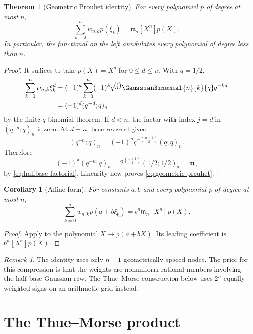 \documentclass[11pt,a4paper,oneside,openany]{book}
\newtheorem{theorem}{Theorem}[chapter]
\newtheorem{corollary}[corollary]{Corollary}
\theoremstyle{definition}
\theoremstyle{remark}
\newtheorem{remark}[remark]{Remark}
\begin{document}
\begin{theorem}[Geometric Prouhet identity]\label{thm:geometric-prouhet}
For every polynomial $p$ of degree at most $n$,
\begin{equation}\label{eq:geometric-prouhet}
 \sum_{k=0}^{n}w_{n,k}p(\xi_k)
 =\mathfrak m_n[X^n]p(X).
\end{equation}
In particular, the functional on the left annihilates every polynomial of degree less than $n$.
\end{theorem}

\begin{proof}
It suffices to take $p(X)=X^d$ for $0\le d\le n$.  With $q=1/2$,
\begin{align*}
 \sum_{k=0}^{n}w_{n,k}\xi_k^d
 &=(-1)^d\sum_{k=0}^{n}(-1)^kq^{\binom k2}
   \GaussianBinomial{n}{k}{q} q^{-kd}\\
 &=(-1)^d(q^{-d};q)_n
\end{align*}
by the finite $q$-binomial theorem.  If $d<n$, the factor with index $j=d$ in
$(q^{-d};q)_n$ is zero.  At $d=n$, base reversal gives
\[
 (q^{-n};q)_n=(-1)^nq^{-\binom{n+1}{2}}(q;q)_n.
\]
Therefore
\[
 (-1)^n(q^{-n};q)_n
 =2^{\binom{n+1}{2}}(1/2;1/2)_n
 =\mathfrak m_n
\]
by \eqref{eq:halfbase-factorial}.  Linearity now proves \eqref{eq:geometric-prouhet}.
\end{proof}

\begin{corollary}[Affine form]\label{cor:geometric-prouhet-affine}
For constants $a,b$ and every polynomial $p$ of degree at most $n$,
\[
 \sum_{k=0}^{n}w_{n,k}p(a+b\xi_k)
 =b^n\mathfrak m_n[X^n]p(X).
\]
\end{corollary}

\begin{proof}
Apply  to the polynomial $X\mapsto p(a+bX)$.  Its leading coefficient is $b^n[X^n]p(X)$.
\end{proof}

\begin{remark}
The identity uses only $n+1$ geometrically spaced nodes.  The price for this compression is that the weights are nonuniform rational numbers involving the half-base Gaussian row.  The Thue--Morse construction below uses $2^n$ equally weighted signs on an arithmetic grid instead.
\end{remark}

\section{The Thue--Morse product}
\end{document}
